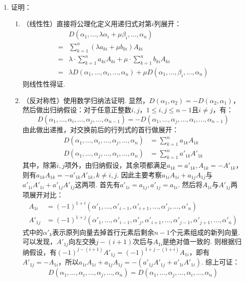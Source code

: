 \begin{enumerate}
    \item 证明：\begin{enumerate}
        \item （线性性）直接将公理化定义用递归式对第$i$列展开：
              \begin{align*}
                      & D(\alpha_1,\ldots,\lambda\alpha_{i}+\mu\beta_i,\ldots,\alpha_n)                                      \\
                  ={} & \sum_{k=1}^{n}(\lambda a_{ki}+\mu b_{ki})A_{ki}                                                      \\
                  ={} & \lambda \cdot \sum_{k=1}^{n}a_{ki}A_{ki}+\mu \cdot \sum_{k=1}^{n}b_{ki}A_{ki}                        \\
                  ={} & \lambda D(\alpha_1,\ldots,\alpha_{i},\ldots,\alpha_n)+\mu D(\alpha_1,\ldots,\beta_i,\ldots,\alpha_n)
              \end{align*}
              则线性性得证.

        \item （反对称性）使用数学归纳法证明. 显然，$D(\alpha_1,\alpha_2)=-D(\alpha_2,\alpha_1)$，然后做出归纳假设：对于任意正整数$i,j$，$1 \leqslant i, j \leqslant n - 1$且$i \neq j$，有：
              \[ D(\alpha_1,\ldots,\alpha_i,\ldots,\alpha_j,\ldots,\alpha_{n-1})=-D(\alpha_1,\ldots,\alpha_j,\ldots,\alpha_i,\ldots,\alpha_{n-1}) \]
              由此做出递推，对交换前后的行列式的首行做展开：
              \begin{align*}
                  D(\alpha_1,\ldots,\alpha_{i},\ldots,\alpha_{j},\ldots,\alpha_n)
                   & =\sum_{k=1}^{n}a_{1k}A_{1k}   \\
                  D(\alpha_1,\ldots,\alpha_{j},\ldots,\alpha_{i},\ldots,\alpha_n)
                   & =\sum_{k=1}^{n}a'_{1k}A'_{1k}
              \end{align*}
              其中，除第$i,j$项外，由归纳假设，其余项都满足$a_{1k}=a'_{1k},A_{1k}=-A'_{1k}$，则有$a_{1k}A_{1k}=-a'_{1k}A'_{1k},k\neq i,j$. 因此主要考察$a_{1i}A_{1i}+a_{1j}A_{1j}$与$a'_{1i}A'_{1i}+a'_{1j}A'_{1j}$这两项. 首先有$a'_{1i}=a_{1j},a'_{1j}=a_{1i}$. 然后将$A_{1i}$与$A'_{1j}$两项展开对比：
              \begin{align*}
                  A_{1i}  & =(-1)^{1+i}(\alpha'_{1},\ldots,\alpha'_{i-1},\alpha'_{i+1},\ldots,\alpha'_{j},\ldots,\alpha'_{n})                             \\
                  A'_{1j} & =(-1)^{1+j}(\alpha'_{1},\ldots,\alpha'_{i-1},\alpha'_{j},\alpha'_{i+1},\ldots,\alpha'_{j-1},\alpha'_{j+1},\ldots,\alpha'_{n})
              \end{align*}
              式中的$\alpha'_k$表示原列向量去掉首行元素后剩余$n-1$个元素组成的新列向量. 可以发现，$A'_{1j}$向左交换$j-(i+1)$次后与$A_{1i}$是绝对值一致的. 则根据归纳假设，有$(-1)^{j-(i+1)}A'_{1j}=(-1)^{1+j-(1+i)}A_{1i}$，即有$A'_{1j}=-A_{1i}$，所以$a_{1i}A_{1i}+a_{1j}A_{1j}=-(a'_{1j}A'_{1j}+a'_{1i}A'_{1i})$. 综上可证：
              \[ D(\alpha_1,\ldots,\alpha_{i},\ldots,\alpha_{j},\ldots,\alpha_n)=D(\alpha_1,\ldots,\alpha_{j},\ldots,\alpha_{i},\ldots,\alpha_n) \]


\end{enumerate}
\end{enumerate}
